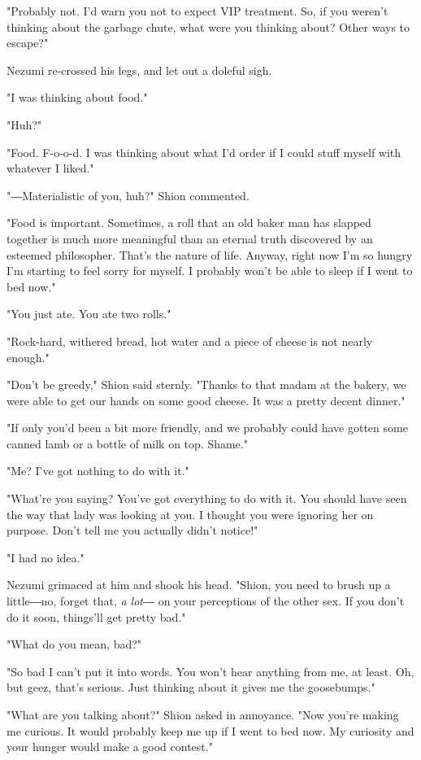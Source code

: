 "Probably not. I'd warn you not to expect VIP treatment. So, if you
weren't thinking about the garbage chute, what were you thinking about?
Other ways to escape?"

Nezumi re-crossed his legs, and let out a doleful sigh.

"I was thinking about food."

"Huh?"

"Food. F-o-o-d. I was thinking about what I'd order if I could stuff
myself with whatever I liked."

"―Materialistic of you, huh?" Shion commented.

"Food is important. Sometimes, a roll that an old baker man has slapped
together is much more meaningful than an eternal truth discovered by an
esteemed philosopher. That's the nature of life. Anyway, right now I'm
so hungry I'm starting to feel sorry for myself. I probably won't be
able to sleep if I went to bed now."

"You just ate. You ate two rolls."

"Rock-hard, withered bread, hot water and a piece of cheese is not
nearly enough."

"Don't be greedy," Shion said sternly. "Thanks to that madam at the
bakery, we were able to get our hands on some good cheese. It was a
pretty decent dinner."

"If only you'd been a bit more friendly, and we probably could have
gotten some canned lamb or a bottle of milk on top. Shame."

"Me? I've got nothing to do with it."

"What're you saying? You've got everything to do with it. You should
have seen the way that lady was looking at you. I thought you were
ignoring her on purpose. Don't tell me you actually didn't notice!"

"I had no idea."

Nezumi grimaced at him and shook his head. "Shion, you need to brush up
a little―no, forget that, \emph{a lot}― on your perceptions of the other sex.
If you don't do it soon, things'll get pretty bad."

"What do you mean, bad?"

"So bad I can't put it into words. You won't hear anything from me, at
least. Oh, but geez, that's serious. Just thinking about it gives me the
goosebumps."

"What are you talking about?" Shion asked in annoyance. "Now you're
making me curious. It would probably keep me up if I went to bed now. My
curiosity and your hunger would make a good contest."

